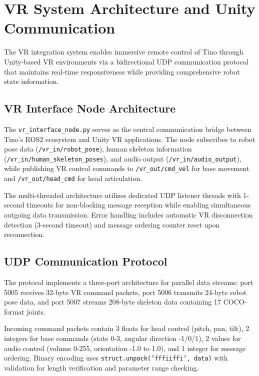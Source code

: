 \section{VR System Architecture and Unity Communication}

The VR integration system enables immersive remote control of Tino through Unity-based VR environments via a bidirectional UDP communication protocol that maintains real-time responsiveness while providing comprehensive robot state information.

\subsection{VR Interface Node Architecture}

The \texttt{vr\_interface\_node.py} serves as the central communication bridge between Tino's ROS2 ecosystem and Unity VR applications. The node subscribes to robot pose data (\texttt{/vr\_in/robot\_pose}), human skeleton information (\texttt{/vr\_in/human\_skeleton\_poses}), and audio output (\texttt{/vr\_in/audio\_output}), while publishing VR control commands to \texttt{/vr\_out/cmd\_vel} for base movement and \texttt{/vr\_out/head\_cmd} for head articulation.

The multi-threaded architecture utilizes dedicated UDP listener threads with 1-second timeouts for non-blocking message reception while enabling simultaneous outgoing data transmission. Error handling includes automatic VR disconnection detection (3-second timeout) and message ordering counter reset upon reconnection.

\subsection{UDP Communication Protocol}

The protocol implements a three-port architecture for parallel data streams: port 5005 receives 32-byte VR command packets, port 5006 transmits 24-byte robot pose data, and port 5007 streams 208-byte skeleton data containing 17 COCO-format joints.

Incoming command packets contain 3 floats for head control (pitch, pan, tilt), 2 integers for base commands (state 0-3, angular direction -1/0/1), 2 values for audio control (volume 0-255, orientation -1.0 to 1.0), and 1 integer for message ordering. Binary encoding uses \texttt{struct.unpack('fffiiffi', data)} with validation for length verification and parameter range checking.

